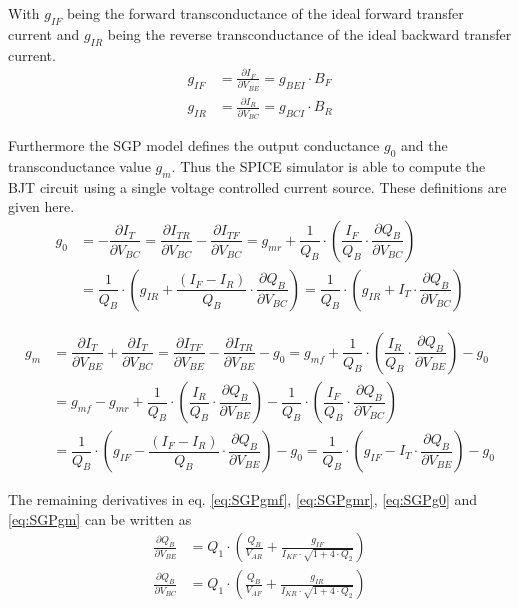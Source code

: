 \documentclass[10pt]{report}
\begin{document}
With $g_{IF}$ being the forward transconductance of the ideal forward
transfer current and $g_{IR}$ being the reverse transconductance of
the ideal backward transfer current.
\begin{align}
g_{IF} &= \frac{\partial I_F}{\partial V_{BE}} = g_{BEI}\cdot B_F\\
g_{IR} &= \frac{\partial I_R}{\partial V_{BC}} = g_{BCI}\cdot B_R
\end{align}

Furthermore the SGP model defines the output conductance $g_0$ and the
transconductance value $g_m$.  Thus the SPICE simulator is able to
compute the BJT circuit using a single voltage controlled current
source.  These definitions are given here.
\begin{equation}
\begin{split}
g_0 &= - \dfrac{\partial I_{T}}{\partial V_{BC}} = \dfrac{\partial I_{TR}}{\partial V_{BC}} - \dfrac{\partial I_{TF}}{\partial V_{BC}} = g_{mr} + \dfrac{1}{Q_B}\cdot\left(\dfrac{I_F}{Q_B}\cdot\dfrac{\partial Q_B}{\partial V_{BC}}\right)\\
&= \dfrac{1}{Q_B}\cdot\left(g_{IR} + \dfrac{\left(I_F - I_R\right)}{Q_B}\cdot\dfrac{\partial Q_B}{\partial V_{BC}}\right) = \dfrac{1}{Q_B}\cdot\left(g_{IR} + I_{T}\cdot\dfrac{\partial Q_B}{\partial V_{BC}}\right)
\end{split}
\label{eq:SGPg0}
\end{equation}

\begin{equation}
\begin{split}
g_m &= \dfrac{\partial I_{T}}{\partial V_{BE}} + \dfrac{\partial I_{T}}{\partial V_{BC}} = \dfrac{\partial I_{TF}}{\partial V_{BE}} - \dfrac{\partial I_{TR}}{\partial V_{BE}} - g_0 = g_{mf} + \dfrac{1}{Q_B}\cdot\left(\dfrac{I_R}{Q_B}\cdot\dfrac{\partial Q_B}{\partial V_{BE}}\right) - g_0\\
&= g_{mf} - g_{mr} + \dfrac{1}{Q_B}\cdot\left(\dfrac{I_R}{Q_B}\cdot\dfrac{\partial Q_B}{\partial V_{BE}}\right) - \dfrac{1}{Q_B}\cdot\left(\dfrac{I_F}{Q_B}\cdot\dfrac{\partial Q_B}{\partial V_{BC}}\right)\\
&= \dfrac{1}{Q_B}\cdot\left(g_{IF} - \dfrac{\left(I_F - I_R\right)}{Q_B}\cdot\dfrac{\partial Q_B}{\partial V_{BE}}\right) - g_0 = \dfrac{1}{Q_B}\cdot\left(g_{IF} - I_T\cdot\dfrac{\partial Q_B}{\partial V_{BE}}\right) - g_0
\end{split}
\label{eq:SGPgm}
\end{equation}

The remaining derivatives in eq. \eqref{eq:SGPgmf}, \eqref{eq:SGPgmr},
\eqref{eq:SGPg0} and \eqref{eq:SGPgm} can be written as
\begin{align}
\frac{\partial Q_B}{\partial V_{BE}} &= Q_1\cdot \left(\frac{Q_B}{V_{AR}} + \frac{g_{IF}}{I_{KF}\cdot \sqrt{1 + 4\cdot Q_2}}\right)\\
\frac{\partial Q_B}{\partial V_{BC}} &= Q_1\cdot \left(\frac{Q_B}{V_{AF}} + \frac{g_{IR}}{I_{KR}\cdot \sqrt{1 + 4\cdot Q_2}}\right)
\end{align}
\end{document}
